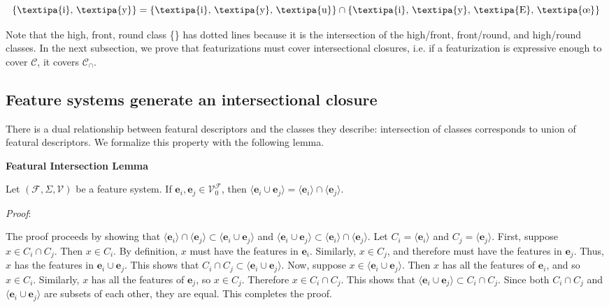 \documentclass[11pt, oneside]{article}   	%
\begin{document}
$$ \text{\{\textipa{i}, \textipa{y}\}} = \text{\{\textipa{i}, \textipa{y}, \textipa{u}\}} \cap \text{\{\textipa{i}, \textipa{y}, \textipa{E}, \textipa{\oe}\}} $$

\vspace{\baselineskip} \noindent Note that the high, front, round class \{\} has dotted lines because it is the intersection of the high/front, front/round, and high/round classes. In the next subsection, we prove that featurizations must cover intersectional closures, i.e. if a featurization is expressive enough to cover $\mathcal C$, it covers $\mathcal C_\cap$.

\subsection{Feature systems generate an intersectional closure}

There is a dual relationship between featural descriptors and the classes they describe: intersection of classes corresponds to union of featural descriptors. We formalize this property with the following lemma.

\vspace{\baselineskip} \noindent \textbf{Featural Intersection Lemma}

Let $(\mathcal F, \Sigma, \mathcal V)$ be a feature system. If $\mathbf{e}_i, \mathbf{e}_j \in \mathcal V_0^\mathcal F$, then $\langle \mathbf{e}_i \cup \mathbf{e}_j \rangle =  \langle \mathbf{e}_i \rangle \cap \langle \mathbf{e}_j \rangle$.

\vspace{\baselineskip} \noindent \textit{Proof}:

The proof proceeds by showing that $ \langle \mathbf{e}_i \rangle \cap \langle \mathbf{e}_j \rangle \subset \langle \mathbf{e}_i \cup \mathbf{e}_j \rangle$ and $\langle \mathbf{e}_i \cup \mathbf{e}_j \rangle \subset  \langle \mathbf{e}_i \rangle \cap \langle \mathbf{e}_j \rangle$.
Let $C_i = \langle \mathbf{e}_i \rangle$ and $C_j = \langle \mathbf{e}_j \rangle$.
First, suppose $x \in C_i \cap C_j$. Then $x \in C_i$. By definition, $x$ must have the features in $\mathbf{e}_i$.
Similarly, $x \in C_j$, and therefore must have the features in $\mathbf{e}_j$.
Thus, $x$ has the features in $\mathbf{e}_i \cup \mathbf{e}_j$. This shows that $C_i \cap C_j \subset \langle \mathbf{e}_i \cup \mathbf{e}_j \rangle$.
Now, suppose $x \in \langle \mathbf{e}_i \cup \mathbf{e}_j \rangle$. Then $x$ has all the features of $\mathbf{e}_i$, and so $x \in C_i$.
Similarly, $x$ has all the features of $\mathbf{e}_j$, so $x \in C_j$. Therefore $x \in C_i \cap C_j$. This shows that $\langle \mathbf{e}_i \cup \mathbf{e}_j \rangle \subset C_i \cap C_j$.
Since both $C_i \cap C_j$ and $\langle \mathbf{e}_i \cup \mathbf{e}_j \rangle$ are subsets of each other, they are equal.
This completes the proof.
\end{document}

